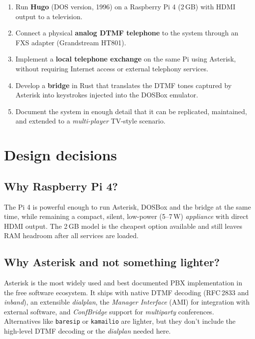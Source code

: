 \begin{enumerate}
  \item Run \textbf{Hugo} (DOS version, 1996) on a Raspberry Pi 4 (2\,GB) with HDMI output to a television.
  \item Connect a physical \textbf{analog DTMF telephone} to the system through an FXS adapter (Grandstream HT801).
  \item Implement a \textbf{local telephone exchange} on the same Pi using Asterisk, without requiring Internet access or external telephony services.
  \item Develop a \textbf{bridge} in Rust that translates the DTMF tones captured by Asterisk into keystrokes injected into the DOSBox emulator.
  \item Document the system in enough detail that it can be replicated, maintained, and extended to a \emph{multi-player} TV-style scenario.
\end{enumerate}

\section{Design decisions}

\subsection{Why Raspberry Pi 4?}

The Pi 4 is powerful enough to run Asterisk, DOSBox and the bridge at the same time, while remaining a compact, silent, low-power (5--7\,W) \emph{appliance} with direct HDMI output. The 2\,GB model is the cheapest option available and still leaves RAM headroom after all services are loaded.

\subsection{Why Asterisk and not something lighter?}

Asterisk is the most widely used and best documented PBX implementation in the free software ecosystem. It ships with native DTMF decoding (RFC\,2833 and \emph{inband}), an extensible \emph{dialplan}, the \emph{Manager Interface} (AMI) for integration with external software, and \emph{ConfBridge} support for \emph{multiparty} conferences. Alternatives like \texttt{baresip} or \texttt{kamailio} are lighter, but they don't include the high-level DTMF decoding or the \emph{dialplan} needed here.

